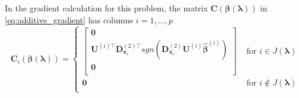 \documentclass[12pt,letterpaper]{article}
\begin{document}
In the gradient calculation for this problem, the matrix $\boldsymbol C(\boldsymbol \beta( \boldsymbol \lambda))$ in \eqref{eq:additive_gradient} has columns $i = 1,...,p$
\begin{equation}
\boldsymbol{C}_i(\boldsymbol \beta( \boldsymbol \lambda))
= \begin{cases}
\begin{bmatrix}
\boldsymbol{0} \\
\boldsymbol {U}^{(i)\top}  \boldsymbol{D}^{(2)\top}_{\boldsymbol{x}_i} 
sgn( \boldsymbol{D}^{(2)}_{\boldsymbol{x}_i} \boldsymbol {U}^{(i)} \hat{\boldsymbol{\beta}}^{(i)}) \\
\boldsymbol{0} \\
\end{bmatrix}
& \text{ for } i \in J(\boldsymbol \lambda) \\
\boldsymbol{0}
& \text{ for } i \not\in J(\boldsymbol \lambda) \\
\end{cases}
\end{equation}
\end{document}

